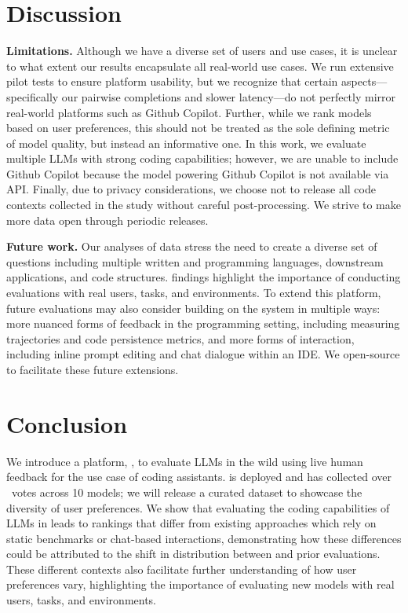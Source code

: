 \section{Discussion}


\textbf{Limitations.} 
Although we have a diverse set of users and use cases, it is unclear to what extent our results encapsulate all real-world use cases.
We run extensive pilot tests to ensure platform usability, but we recognize that certain aspects---specifically our pairwise completions and slower latency---do not perfectly mirror real-world platforms such as Github Copilot.
Further, while we rank models based on user preferences, this should not be treated as the sole defining metric of model quality, but instead an informative one.
In this work, we evaluate multiple LLMs with strong coding capabilities; however, we are unable to include Github Copilot because the model powering Github Copilot is not available via API.
Finally, due to privacy considerations, we choose not to release all code contexts collected in the study without careful post-processing.
We strive to make more data open through periodic releases.

\textbf{Future work.} Our analyses of \systemName data stress the need to create a diverse set of questions including multiple written and programming languages, downstream applications, and code structures.
\systemName findings highlight the importance of conducting evaluations with real users, tasks, and environments.
To extend this platform, future evaluations may also consider building on the \systemName system in multiple ways: more nuanced forms of feedback in the programming setting, including measuring trajectories and code persistence metrics, and more forms of interaction, including inline prompt editing and chat dialogue within an IDE.
We open-source \systemName to facilitate these future extensions.

\section{Conclusion}

We introduce a platform, \systemName, to evaluate LLMs in the wild using live human feedback for the use case of coding assistants.
\systemName is deployed and has collected over \sampleCount~votes across 10 models; we will release a curated dataset to showcase the diversity of user preferences.
We show that evaluating the coding capabilities of LLMs in \systemName leads to rankings that differ from existing approaches which rely on static benchmarks or chat-based interactions, demonstrating how these differences could be attributed to the shift in distribution between \systemName and prior evaluations. 
These different contexts also facilitate further understanding of how user preferences vary, highlighting the importance of evaluating new models with real users, tasks, and environments.



